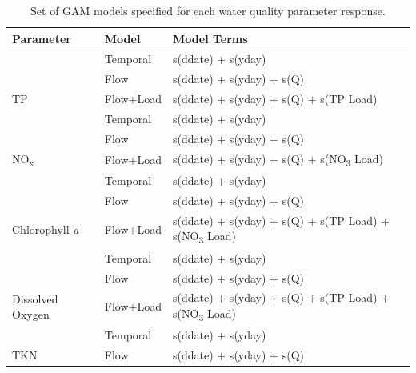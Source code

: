 \documentclass[fleqn,10pt,lineno]{wlpeerj} %
\begin{document}
\begin{table}

\caption{\label{tab:table3}Set of GAM models specified for each water quality parameter response.}
\centering
\begin{tabular}[t]{lll}
\toprule
Parameter & Model & Model Terms\\
\midrule
 & Temporal & s(ddate) + s(yday)\\

 & Flow & s(ddate) + s(yday) + s(Q)\\

\multirow{-3}{*}{\raggedright\arraybackslash TP} & Flow+Load & s(ddate) + s(yday) + s(Q) + s(TP Load)\\
\cmidrule{1-3}
 & Temporal & s(ddate) + s(yday)\\

 & Flow & s(ddate) + s(yday) + s(Q)\\

\multirow{-3}{*}{\raggedright\arraybackslash NO\textsubscript{x}} & Flow+Load & s(ddate) + s(yday) + s(Q) + s(NO\textsubscript{3} Load)\\
\cmidrule{1-3}
 & Temporal & s(ddate) + s(yday)\\

 & Flow & s(ddate) + s(yday) + s(Q)\\

\multirow{-3}{*}{\raggedright\arraybackslash Chlorophyll-\textit{a}} & Flow+Load & s(ddate) + s(yday) + s(Q) + s(TP Load) + s(NO\textsubscript{3} Load)\\
\cmidrule{1-3}
 & Temporal & s(ddate) + s(yday)\\

 & Flow & s(ddate) + s(yday) + s(Q)\\

\multirow{-3}{*}{\raggedright\arraybackslash Dissolved Oxygen} & Flow+Load & s(ddate) + s(yday) + s(Q) + s(TP Load) + s(NO\textsubscript{3}  Load)\\
\cmidrule{1-3}
 & Temporal & s(ddate) + s(yday)\\

\multirow{-2}{*}{\raggedright\arraybackslash TKN} & Flow & s(ddate) + s(yday) + s(Q)\\
\bottomrule
\end{tabular}
\end{table}
\end{document}
